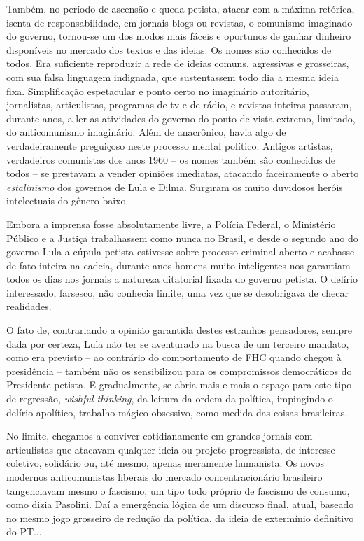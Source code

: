 Também, no período de ascensão e queda petista, atacar com a máxima
retórica, isenta de responsabilidade, em jornais blogs ou revistas, o
comunismo imaginado do governo, tornou-se um dos modos mais fáceis e
oportunos de ganhar dinheiro disponíveis no mercado dos textos e das
ideias. Os nomes são conhecidos de todos. Era suficiente reproduzir a
rede de ideias comuns, agressivas e grosseiras, com sua falsa linguagem
indignada, que sustentassem todo dia a mesma ideia fixa. Simplificação
espetacular e ponto certo no imaginário autoritário, jornalistas,
articulistas, programas de tv e de rádio, e revistas inteiras passaram,
durante anos, a ler as atividades do governo do ponto de vista extremo,
limitado, do anticomunismo imaginário. Além de anacrônico, havia algo de
verdadeiramente preguiçoso neste processo mental político. Antigos
artistas, verdadeiros comunistas dos anos 1960 -- os nomes também são
conhecidos de todos -- se prestavam a vender opiniões imediatas,
atacando faceiramente o aberto \emph{estalinismo} dos governos de Lula e
Dilma. Surgiram os muito duvidosos heróis intelectuais do gênero baixo.

Embora a imprensa fosse absolutamente livre, a Polícia Federal, o
Ministério Público e a Justiça trabalhassem como nunca no Brasil, e
desde o segundo ano do governo Lula a cúpula petista estivesse sobre
processo criminal aberto e acabasse de fato inteira na cadeia, durante
anos homens muito inteligentes nos garantiam todos os dias nos jornais a
natureza ditatorial fixada do governo petista. O delírio interessado,
farsesco, não conhecia limite, uma vez que se desobrigava de checar
realidades.

O fato de, contrariando a opinião garantida destes estranhos pensadores,
sempre dada por certeza, Lula não ter se aventurado na busca de um
terceiro mandato, como era previsto -- ao contrário do comportamento de
FHC quando chegou à presidência -- também não os sensibilizou para os
compromissos democráticos do Presidente petista. E gradualmente, se
abria mais e mais o espaço para este tipo de regressão, \emph{wishful
thinking}, da leitura da ordem da política, impingindo o delírio
apolítico, trabalho mágico obsessivo, como medida das coisas
brasileiras.

No limite, chegamos a conviver cotidianamente em grandes jornais com
articulistas que atacavam qualquer ideia ou projeto progressista, de
interesse coletivo, solidário ou, até mesmo, apenas meramente humanista.
Os novos modernos anticomunistas liberais do mercado concentracionário
brasileiro tangenciavam mesmo o fascismo, um tipo todo próprio de
fascismo de consumo, como dizia Pasolini. Daí a emergência lógica de um
discurso final, atual, baseado no mesmo jogo grosseiro de redução da
política, da ideia de extermínio definitivo do PT...

